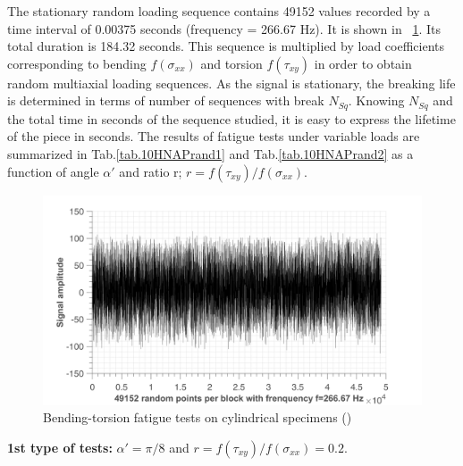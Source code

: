\documentclass[3p,times,procedia,number]{elsarticle}
\newcommand{\figref}[1]{\figurename~\ref{#1}}
\begin{document}
The stationary random loading sequence contains 49152 values recorded by a time interval of 0.00375 seconds (frequency = 266.67 Hz). It is shown in \figref{fig.10HNAPrandom}. Its total duration is 184.32 seconds. This sequence is multiplied by load coefficients corresponding to bending $f (\sigma_{xx})$ and torsion $f (\tau_{xy})$ in order to obtain random multiaxial loading sequences. As the signal is stationary, the breaking life is determined in terms of number of sequences with break $N_{Sq}$. Knowing $N_{Sq}$ and the total time in seconds of the sequence studied, it is easy to express the lifetime of the piece in seconds. The results of fatigue tests under variable loads are summarized in Tab.\ref{tab.10HNAPrand1} and Tab.\ref{tab.10HNAPrand2} as a function of angle $\alpha'$ and ratio r; $r =f(\tau_{xy})/f(\sigma_{xx})$.
\begin{figure}[!h]
	\centering
	\includegraphics[width=\textwidth]{figures//10HNAPrandomblock.png} 
	\caption{Bending-torsion fatigue tests on cylindrical specimens (\cite{carpinteri2003multiaxial})}
	\label{fig.10HNAPrandom}
\end{figure}

\textbf{1st type of tests:} $\alpha' = \pi / 8$ and $r =f(\tau_{xy})/f(\sigma_{xx})=0.2$.
\end{document}
